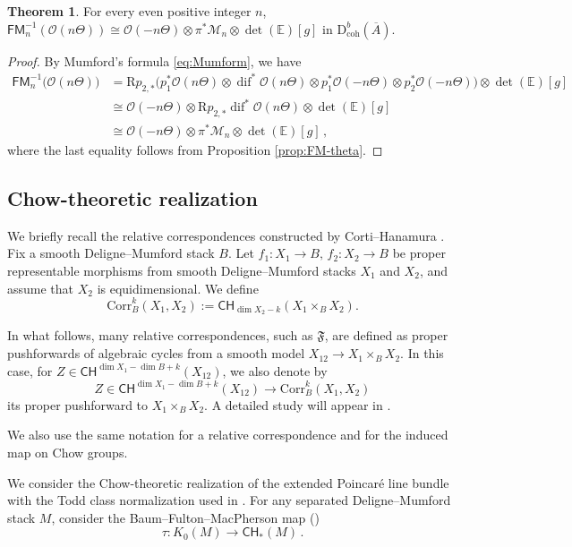 \documentclass[11pt]{article}
\def\Mc{\mathcal{M}}
\def\CH{\mathsf{CH}}
\def\CO{\mathcal{O}}
\def\fm{\mathfrak{F}}
\def\dbcoh{\mathrm{D}^b_{\mathrm{coh}}}
\def\FM{\mathsf{FM}}
\newcommand{\barA}{\overline{A}}
\newcommand{\corr}{\mathrm{Corr}}
\newcommand{\diff}{\operatorname{dif}}
\theoremstyle{definition}
\newtheorem{theorem}[definition]{Theorem}
\begin{document}
\begin{theorem}\label{thm:FM-1Db}
For every even positive integer $n$, $\FM^{-1}_n(\mathcal O(n\Theta)) \cong \mathcal O(-n\Theta)\otimes \pi^*\mathcal M_n\otimes \det(\mathbb E)[g]$ in $\dbcoh(\barA)$.
\end{theorem}
\begin{proof}
    By Mumford's formula \eqref{eq:Mumform}, we have
    \begin{align*}
        \FM^{-1}_n\big(\CO(n\Theta)\big)
    &= \mathrm{R}p_{2,*}\!\Big(p_1^*\CO(n\Theta)
    \otimes \diff^*\CO(n\Theta)
    \otimes p_1^*\CO(-n\Theta)
    \otimes p_2^*\CO(-n\Theta)
    \Big)\otimes \det(\mathbb E)[g] \\
    &\cong
    \CO(-n\Theta) \otimes \mathrm{R}p_{2,*}\diff^*\CO(n\Theta)\otimes \det(\mathbb E)[g] \\
    &\cong
    \CO(-n\Theta) \otimes \pi^*\Mc_n\otimes \det(\mathbb E)[g]\,,
    \end{align*}
    where the last equality follows from Proposition \ref{prop:FM-theta}.
\end{proof}

\subsection{Chow-theoretic realization}\label{sec:chow}

We briefly recall the relative correspondences constructed by Corti--Hanamura \cite{CortiHanamura}. Fix a smooth Deligne--Mumford stack $B$. Let $f_1 : X_1 \to B, \,f_2 : X_2 \to B$ be proper representable morphisms from smooth Deligne--Mumford stacks $X_1$ and $X_2$, and assume that $X_2$ is equidimensional. We define
\[
\corr_B^k(X_1,X_2) := \CH_{\dim X_2-k}(X_1\times_B X_2).
\]

In what follows, many relative correspondences, such as $\fm$, are defined as proper pushforwards of algebraic cycles from a smooth model $X_{12} \to X_1 \times_B X_2$. In this case, for $Z \in \CH^{\dim X_1-\dim B+k}(X_{12})$, we also denote by
\[
Z \in \CH^{\dim X_1-\dim B+k}(X_{12}) \to \corr_B^{k}(X_1,X_2)
\]
its proper pushforward to $X_1 \times_B X_2$. A detailed study will appear in \cite{BP}.

We also use the same notation for a relative correspondence and for the induced map on Chow groups.

We consider the Chow-theoretic realization of the extended Poincar\'e line bundle with the Todd class normalization used in \cite{PerverseFourierMSY25}. For any separated Deligne--Mumford stack $M$, consider the Baum--Fulton--MacPherson map (\cite[Chapter 18]{Fulton})
\begin{equation}\label{eq:bfm}
    \tau : K_0(M) \to \CH_*(M)\,.
\end{equation}
\end{document}
